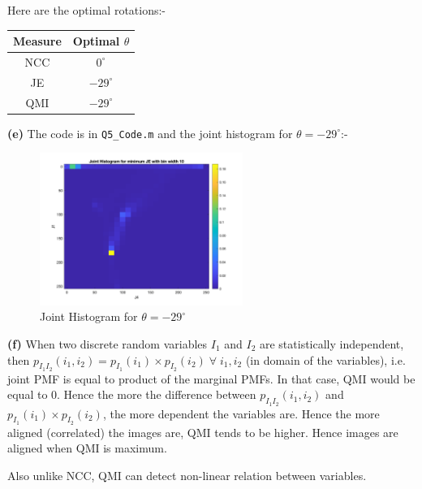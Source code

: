 \documentclass[12pt]{article}
\begin{document}
    \vspace{-10pt}
    
    Here are the optimal rotations:-
    
    \vspace{-10pt}
    
    \begin{table}[H]
        \centering
        \begin{tabular}{|c|c|}
            \hline
            Measure & Optimal $\theta$ \\
            \hline
            NCC & $0^{\circ}$ \\
            JE & $-29^{\circ}$ \\
            QMI & $-29^{\circ}$ \\
            \hline
        \end{tabular}
    \end{table}
    
    \vspace{-10pt}
    
    \textbf{(e)} The code is in \texttt{Q5\_Code.m} and the joint histogram for $\theta = -29^{\circ}$:-
    
    \vspace{-13pt}
    
    \begin{figure}[H]
        \centering
        \includegraphics[width=0.59\textwidth]{../images/Joint_hist_JE.png}
        \vspace{-10pt}
        \caption{Joint Histogram for $\theta = -29^{\circ}$}
    \end{figure}
    
    \vspace{-10pt}

    \textbf{(f)} When two discrete random variables $I_1$ and $I_2$ are statistically independent, then $p_{I_1 I_2}(i_1,i_2)=p_{I_1}(i_1) \times p_{I_2}(i_2) \; \forall \; i_1, i_2$ (in domain of the variables), i.e. joint PMF is equal to product of the marginal PMFs. In that case, QMI would be equal to $0$. Hence the more the difference between $p_{I_1 I_2}(i_1,i_2)$ and $p_{I_1}(i_1) \times p_{I_2}(i_2)$, the more dependent the variables are. Hence the more aligned (correlated) the images are, QMI tends to be higher. Hence images are aligned when QMI is maximum.
    
    Also unlike NCC, QMI can detect non-linear relation between variables.
\clearpage
\end{document}

